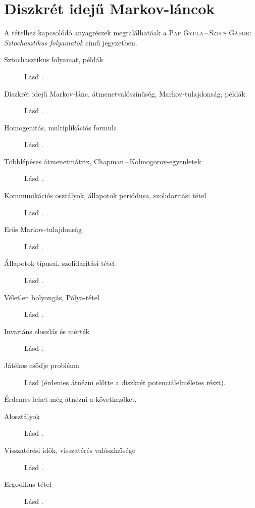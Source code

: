 \documentclass[%
	DIV=15,appendixprefix]{scrreprt}
\theoremstyle{definition}
\theoremstyle{remark}
\begin{document}
\section{Diszkrét idejű Markov-láncok}
A tételhez kapcsolódó anyagrészek megtalálhatóak a \textsc{Pap Gyula\,--\,Szűcs Gábor}:
\emph{Sztochasztikus folyamatok} \cite{PapSzucs} című jegyzetben.
%
\begin{description}
	\item[Sztochasztikus folyamat, példák] Lásd \cite[3--4.~oldal]{PapSzucs}.
	\item[Diszkrét idejű Markov-lánc, átmenetvalószínűség, Markov-tulajdonság, példák] Lásd
		\cite[12--16.~oldal]{PapSzucs}.
	\item[Homogenitás, multiplikációs formula] Lásd \cite[19--20.~oldal]{PapSzucs}.
	\item[Többlépéses átmenetmátrix, Chapman\,--\,Kolmogorov-egyenletek] Lásd
		\cite[22.~oldal]{PapSzucs}.
	\item[Kommunikációs osztályok, állapotok periódusa, szolidaritási tétel] Lásd
		\cite[24--26.~oldal]{PapSzucs}.
	\item[Erős Markov-tulajdonság] Lásd \cite[29--30.~oldal]{PapSzucs}.
	\item[Állapotok típusai, szolidaritási tétel] Lásd \cite[39--44.~oldal]{PapSzucs}.
	\item[Véletlen bolyongás, Pólya-tétel] Lásd \cite[45--47.~oldal]{PapSzucs}.
	\item[Invariáns eloszlás és mérték] Lásd \cite[48--55.~oldal]{PapSzucs}.
	\item[Játékos csődje probléma] Lásd \cite[62--64.~oldal]{PapSzucs} (érdemes átnézni előtte a
		diszkrét potenciálelméletes részt).
\end{description}
Érdemes lehet még átnézni a következőket.
\begin{description}
	\item[Alosztályok] Lásd \cite[28.~oldal]{PapSzucs}.
	\item[Visszatérési idők, visszatérés valószínűsége] Lásd \cite[32.~oldal]{PapSzucs}.
	\item[Ergodikus tétel] Lásd \cite[55--57.~oldal]{PapSzucs}.
\end{description}
%
\end{document}

